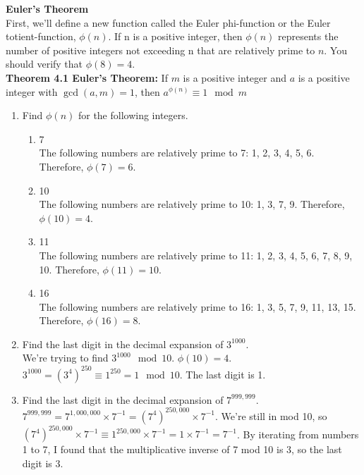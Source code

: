 \documentclass{article}
\begin{document}
\begin{flushleft}
    \LARGE\textbf{Euler's Theorem}\normalsize\\ \vspace{11pt}
    First, we’ll define a new function called the Euler phi-function or the Euler totient-function, $\phi(n)$. If n is a positive integer, then $\phi(n)$ represents the number of positive integers not exceeding n that are relatively prime to $n$. You should verify that $\phi(8) = 4$.\\
    
    \textbf{Theorem 4.1 Euler's Theorem:} If $m$ is a positive integer and $a$ is a positive integer with $\gcd(a, m) = 1$, then $a^{\phi(n)} \equiv 1 \mod{m}$
\end{flushleft}

\begin{enumerate}
    \item Find $\phi(n)$ for the following integers.
        \begin{enumerate}
            \item 7\\
            The following numbers are relatively prime to 7: 1, 2, 3, 4, 5, 6. Therefore, $\phi(7) = 6$.
            \item 10\\
            The following numbers are relatively prime to 10: 1, 3, 7, 9. Therefore, $\phi(10)=4$.
            \item 11\\
            The following numbers are relatively prime to 11: 1, 2, 3, 4, 5, 6, 7, 8, 9, 10. Therefore, $\phi(11) = 10$.
            \item 16\\
            The following numbers are relatively prime to 16: 1, 3, 5, 7, 9, 11, 13, 15. Therefore, $\phi(16) = 8$.
        \end{enumerate}
    \item Find the last digit in the decimal expansion of $3^{1000}$.\\
        We're trying to find $3^{1000} \mod 10$. $\phi(10) = 4$. $3^{1000} = (3^{4})^{250} \equiv 1^{250} = 1 \mod{10}$. The last digit is 1.
    \item Find the last digit in the decimal expansion of $7^{999,999}$.\\
    $7^{999,999} = 7^{1,000,000} \times 7^{-1} = (7^{4})^{250,000} \times 7^{-1}$. We're still in mod 10, so $(7^{4})^{250,000} \times 7^{-1} \equiv 1^{250,000} \times 7^{-1} = 1 \times 7^{-1} = 7^{-1}$. By iterating from numbers 1 to 7, I found that the multiplicative inverse of 7 mod 10 is 3, so the last digit is 3.

\end{enumerate}
\end{document}

